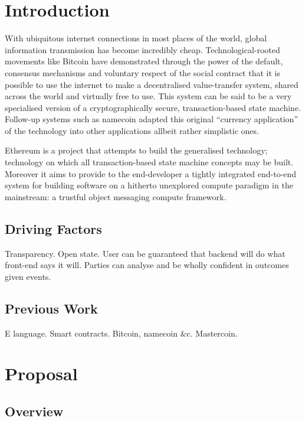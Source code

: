 \documentclass[9pt,oneside]{amsart}
\begin{document}
\setlength{\columnsep}{20pt}
\begin{multicols}{2}

\section{Introduction}\label{sec:introduction}

With ubiquitous internet connections in most places of the world, global information transmission has become incredibly cheap. Technological-rooted movements like Bitcoin have demonstrated through the power of the default, consensus mechanisms and voluntary respect of the social contract that it is possible to use the internet to make a decentralised value-transfer system, shared across the world and virtually free to use. This system can be said to be a very specialised version of a cryptographically secure, transaction-based state machine. Follow-up systems such as namecoin adapted this original ``currency application'' of the technology into other applications allbeit rather simplistic ones.

Ethereum is a project that attempts to build the generalised technology; technology on which all transaction-based state machine concepts may be built. Moreover it aims to provide to the end-developer a tightly integrated end-to-end system for building software on a hitherto unexplored compute paradigm in the mainstream: a trustful object messaging compute framework.

\subsection{Driving Factors} \label{ch:driving}

Transparency. Open state. User can be guaranteed that backend will do what front-end says it will. Parties can analyse and be wholly confident in outcomes given events.

\subsection{Previous Work} \label{ch:previous}

E language. Smart contracts. Bitcoin, namecoin \&c. Mastercoin.

\section{Proposal} \label{ch:proposal}

\subsection{Overview} \label{ch:overview}


\end{multicols}
\end{document}

